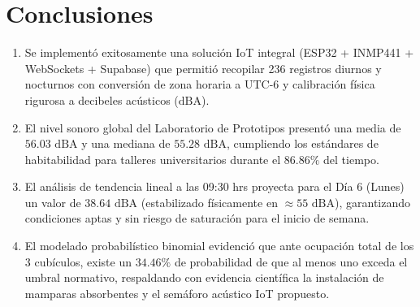 \documentclass{article}
\begin{document}
\section{Conclusiones}
\begin{enumerate}
    \item Se implementó exitosamente una solución IoT integral (ESP32 + INMP441 + WebSockets + Supabase) que permitió recopilar 236 registros diurnos y nocturnos con conversión de zona horaria a UTC-6 y calibración física rigurosa a decibeles acústicos ($\text{dBA}$).
    \item El nivel sonoro global del Laboratorio de Prototipos presentó una media de $56.03\text{ dBA}$ y una mediana de $55.28\text{ dBA}$, cumpliendo los estándares de habitabilidad para talleres universitarios durante el $86.86\%$ del tiempo.
    \item El análisis de tendencia lineal a las 09:30 hrs proyecta para el Día 6 (Lunes) un valor de $38.64\text{ dBA}$ (estabilizado físicamente en $\approx 55\text{ dBA}$), garantizando condiciones aptas y sin riesgo de saturación para el inicio de semana.
    \item El modelado probabilístico binomial evidenció que ante ocupación total de los 3 cubículos, existe un $34.46\%$ de probabilidad de que al menos uno exceda el umbral normativo, respaldando con evidencia científica la instalación de mamparas absorbentes y el semáforo acústico IoT propuesto.
\end{enumerate}
\end{document}

